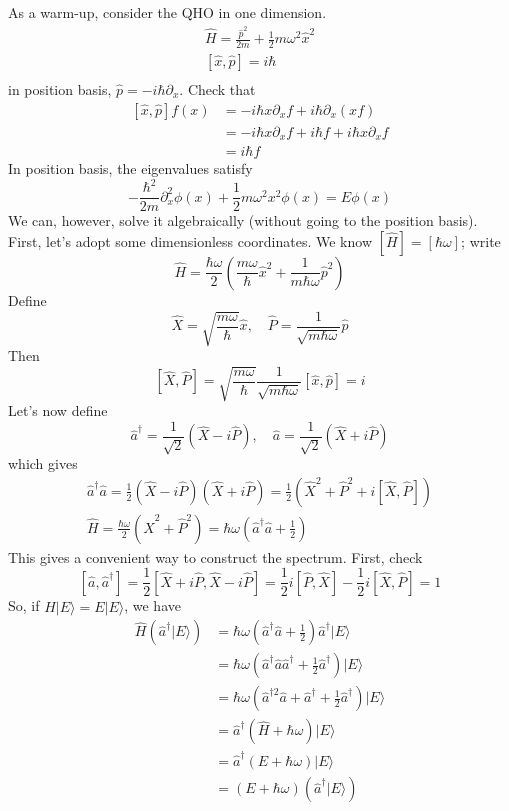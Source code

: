 As a warm-up, consider the QHO in one dimension.
\begin{gather*}
    \hat{H}=\frac{\hat{p}^2}{2m}+\frac{1}{2}m\omega ^2\hat{x}^2 \\
    \left[ \hat{x},\hat{p} \right] =i\hbar \\
\end{gather*}
in position basis, $\hat{p}=-i\hbar \partial _x$. Check that
\begin{align*}
    \left[ \hat{x},\hat{p} \right] f\left( x \right) &=-i\hbar x\partial _xf+i\hbar \partial _x\left( xf \right) \\
    &=-i\hbar x\partial _xf+i\hbar f+i\hbar x\partial _xf\\
    &=i\hbar f
\end{align*}
In position basis, the eigenvalues satisfy
\[ -\frac{\hbar ^2}{2m}\partial _{x}^{2}\phi \left( x \right) +\frac{1}{2}m\omega ^2x^2\phi \left( x \right) =E\phi \left( x \right) \]
We can, however, solve it algebraically (without going to the position basis). First, let's adopt some dimensionless coordinates. We know $[\hat{H}]=[\hbar\omega]$; write
\[ \hat{H}=\frac{\hbar \omega}{2}\left( \frac{m\omega}{\hbar}\hat{x}^2+\frac{1}{m\hbar \omega}\hat{p}^2 \right) \]
Define
\[ \hat{X}=\sqrt{\frac{m\omega}{\hbar}}\hat{x},\quad \hat{P}=\frac{1}{\sqrt{m\hbar \omega}}\hat{p} \]
Then
\[ \left[ \hat{X},\hat{P} \right] =\sqrt{\frac{m\omega}{\hbar}}\frac{1}{\sqrt{m\hbar \omega}}\left[ \hat{x},\hat{p} \right] =i \]
Let's now define
\[ \hat{a}^{\dagger}=\frac{1}{\sqrt{2}}\left( \hat{X}-i\hat{P} \right) ,\quad \hat{a}=\frac{1}{\sqrt{2}}\left( \hat{X}+i\hat{P} \right) \]
which gives
\begin{gather*}
    \hat{a}^{\dagger}\hat{a}=\frac{1}{2}\left( \hat{X}-i\hat{P} \right) \left( \hat{X}+i\hat{P} \right) =\frac{1}{2}\left( \hat{X}^2+\hat{P}^2+i\left[ \hat{X},\hat{P} \right] \right) \\
    \hat{H}=\frac{\hbar \omega}{2}\left( \hat{X}^2+\hat{P}^2 \right) =\hbar \omega \left( \hat{a}^{\dagger}\hat{a}+\frac{1}{2} \right)
\end{gather*}
This gives a convenient way to construct the spectrum. First, check
\[ \left[ \hat{a},\hat{a}^{\dagger} \right] =\frac{1}{2}\left[ \hat{X}+i\hat{P},\hat{X}-i\hat{P} \right] =\frac{1}{2}i\left[ \hat{P},\hat{X} \right] -\frac{1}{2}i\left[ \hat{X},\hat{P} \right] =1 \]
So, if $\hat{H}|E\rangle =E|E\rangle$, we have
\begin{align*}
    \hat{H}\left( \hat{a}^{\dagger}|E\rangle \right) &=\hbar \omega \left( \hat{a}^{\dagger}\hat{a}+\frac{1}{2} \right) \hat{a}^{\dagger}|E\rangle \\
    &=\hbar \omega \left( \hat{a}^{\dagger}\hat{a}\hat{a}^{\dagger}+\frac{1}{2}\hat{a}^{\dagger} \right) |E\rangle \\
    &=\hbar \omega \left( \hat{a}^{\dagger 2}\hat{a}+\hat{a}^{\dagger}+\frac{1}{2}\hat{a}^{\dagger} \right) |E\rangle \\
    &=\hat{a}^{\dagger}\left( \hat{H}+\hbar \omega \right) |E\rangle \\
    &=\hat{a}^{\dagger}\left( E+\hbar \omega \right) |E\rangle \\
    &=\left( E+\hbar \omega \right) \left( \hat{a}^{\dagger}|E\rangle \right)
\end{align*}
